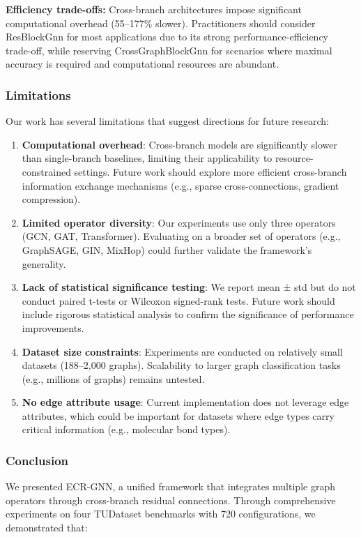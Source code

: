 \textbf{Efficiency trade-offs:} Cross-branch architectures impose significant computational overhead (55--177\% slower). Practitioners should consider ResBlockGnn for most applications due to its strong performance-efficiency trade-off, while reserving CrossGraphBlockGnn for scenarios where maximal accuracy is required and computational resources are abundant.

\subsubsection{Limitations}

Our work has several limitations that suggest directions for future research:

\begin{enumerate}
    \item \textbf{Computational overhead}: Cross-branch models are significantly slower than single-branch baselines, limiting their applicability to resource-constrained settings. Future work should explore more efficient cross-branch information exchange mechanisms (e.g., sparse cross-connections, gradient compression).
    \item \textbf{Limited operator diversity}: Our experiments use only three operators (GCN, GAT, Transformer). Evaluating on a broader set of operators (e.g., GraphSAGE, GIN, MixHop) could further validate the framework's generality.
    \item \textbf{Lack of statistical significance testing}: We report mean ± std but do not conduct paired t-tests or Wilcoxon signed-rank tests. Future work should include rigorous statistical analysis to confirm the significance of performance improvements.
    \item \textbf{Dataset size constraints}: Experiments are conducted on relatively small datasets (188--2,000 graphs). Scalability to larger graph classification tasks (e.g., millions of graphs) remains untested.
    \item \textbf{No edge attribute usage}: Current implementation does not leverage edge attributes, which could be important for datasets where edge types carry critical information (e.g., molecular bond types).
\end{enumerate}

\subsubsection{Conclusion}

We presented ECR-GNN, a unified framework that integrates multiple graph operators through cross-branch residual connections. Through comprehensive experiments on four TUDataset benchmarks with 720 configurations, we demonstrated that:

